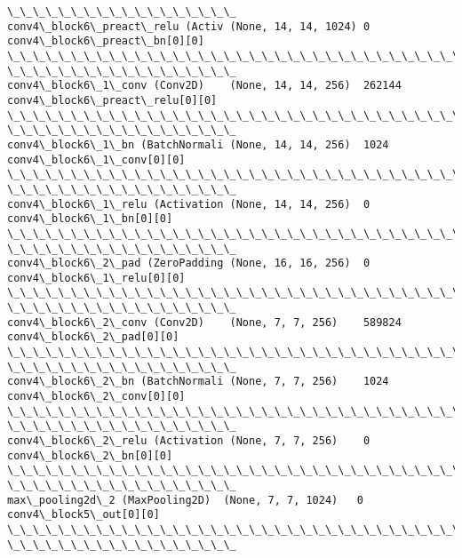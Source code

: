 \documentclass[11pt]{article}
\begin{document}
\begin{Verbatim}[commandchars=\\\{\}]
\_\_\_\_\_\_\_\_\_\_\_\_\_\_\_\_\_\_
conv4\_block6\_preact\_relu (Activ (None, 14, 14, 1024) 0
conv4\_block6\_preact\_bn[0][0]
\_\_\_\_\_\_\_\_\_\_\_\_\_\_\_\_\_\_\_\_\_\_\_\_\_\_\_\_\_\_\_\_\_\_\_\_\_\_\_\_\_\_\_\_\_\_\_\_\_\_\_\_\_\_\_\_\_\_\_\_\_\_\_\_\_\_\_\_\_\_\_\_\_\_\_\_\_\_\_\_
\_\_\_\_\_\_\_\_\_\_\_\_\_\_\_\_\_\_
conv4\_block6\_1\_conv (Conv2D)    (None, 14, 14, 256)  262144
conv4\_block6\_preact\_relu[0][0]
\_\_\_\_\_\_\_\_\_\_\_\_\_\_\_\_\_\_\_\_\_\_\_\_\_\_\_\_\_\_\_\_\_\_\_\_\_\_\_\_\_\_\_\_\_\_\_\_\_\_\_\_\_\_\_\_\_\_\_\_\_\_\_\_\_\_\_\_\_\_\_\_\_\_\_\_\_\_\_\_
\_\_\_\_\_\_\_\_\_\_\_\_\_\_\_\_\_\_
conv4\_block6\_1\_bn (BatchNormali (None, 14, 14, 256)  1024
conv4\_block6\_1\_conv[0][0]
\_\_\_\_\_\_\_\_\_\_\_\_\_\_\_\_\_\_\_\_\_\_\_\_\_\_\_\_\_\_\_\_\_\_\_\_\_\_\_\_\_\_\_\_\_\_\_\_\_\_\_\_\_\_\_\_\_\_\_\_\_\_\_\_\_\_\_\_\_\_\_\_\_\_\_\_\_\_\_\_
\_\_\_\_\_\_\_\_\_\_\_\_\_\_\_\_\_\_
conv4\_block6\_1\_relu (Activation (None, 14, 14, 256)  0
conv4\_block6\_1\_bn[0][0]
\_\_\_\_\_\_\_\_\_\_\_\_\_\_\_\_\_\_\_\_\_\_\_\_\_\_\_\_\_\_\_\_\_\_\_\_\_\_\_\_\_\_\_\_\_\_\_\_\_\_\_\_\_\_\_\_\_\_\_\_\_\_\_\_\_\_\_\_\_\_\_\_\_\_\_\_\_\_\_\_
\_\_\_\_\_\_\_\_\_\_\_\_\_\_\_\_\_\_
conv4\_block6\_2\_pad (ZeroPadding (None, 16, 16, 256)  0
conv4\_block6\_1\_relu[0][0]
\_\_\_\_\_\_\_\_\_\_\_\_\_\_\_\_\_\_\_\_\_\_\_\_\_\_\_\_\_\_\_\_\_\_\_\_\_\_\_\_\_\_\_\_\_\_\_\_\_\_\_\_\_\_\_\_\_\_\_\_\_\_\_\_\_\_\_\_\_\_\_\_\_\_\_\_\_\_\_\_
\_\_\_\_\_\_\_\_\_\_\_\_\_\_\_\_\_\_
conv4\_block6\_2\_conv (Conv2D)    (None, 7, 7, 256)    589824
conv4\_block6\_2\_pad[0][0]
\_\_\_\_\_\_\_\_\_\_\_\_\_\_\_\_\_\_\_\_\_\_\_\_\_\_\_\_\_\_\_\_\_\_\_\_\_\_\_\_\_\_\_\_\_\_\_\_\_\_\_\_\_\_\_\_\_\_\_\_\_\_\_\_\_\_\_\_\_\_\_\_\_\_\_\_\_\_\_\_
\_\_\_\_\_\_\_\_\_\_\_\_\_\_\_\_\_\_
conv4\_block6\_2\_bn (BatchNormali (None, 7, 7, 256)    1024
conv4\_block6\_2\_conv[0][0]
\_\_\_\_\_\_\_\_\_\_\_\_\_\_\_\_\_\_\_\_\_\_\_\_\_\_\_\_\_\_\_\_\_\_\_\_\_\_\_\_\_\_\_\_\_\_\_\_\_\_\_\_\_\_\_\_\_\_\_\_\_\_\_\_\_\_\_\_\_\_\_\_\_\_\_\_\_\_\_\_
\_\_\_\_\_\_\_\_\_\_\_\_\_\_\_\_\_\_
conv4\_block6\_2\_relu (Activation (None, 7, 7, 256)    0
conv4\_block6\_2\_bn[0][0]
\_\_\_\_\_\_\_\_\_\_\_\_\_\_\_\_\_\_\_\_\_\_\_\_\_\_\_\_\_\_\_\_\_\_\_\_\_\_\_\_\_\_\_\_\_\_\_\_\_\_\_\_\_\_\_\_\_\_\_\_\_\_\_\_\_\_\_\_\_\_\_\_\_\_\_\_\_\_\_\_
\_\_\_\_\_\_\_\_\_\_\_\_\_\_\_\_\_\_
max\_pooling2d\_2 (MaxPooling2D)  (None, 7, 7, 1024)   0
conv4\_block5\_out[0][0]
\_\_\_\_\_\_\_\_\_\_\_\_\_\_\_\_\_\_\_\_\_\_\_\_\_\_\_\_\_\_\_\_\_\_\_\_\_\_\_\_\_\_\_\_\_\_\_\_\_\_\_\_\_\_\_\_\_\_\_\_\_\_\_\_\_\_\_\_\_\_\_\_\_\_\_\_\_\_\_\_
\_\_\_\_\_\_\_\_\_\_\_\_\_\_\_\_\_\_

\end{Verbatim}
\end{document}
